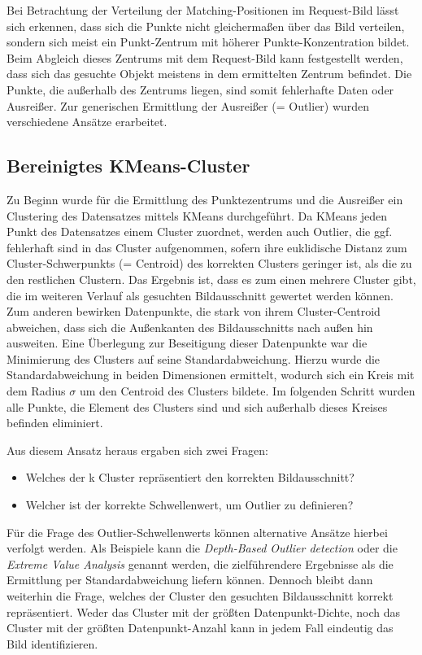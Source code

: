 \documentclass[
    type=Projektarbeit,
    status=draft, %
    language=german, %
    bibengine=bibtex,
]{unibwm-inf-thesis}
\begin{document}
    Bei Betrachtung der Verteilung der Matching-Positionen im Request-Bild lässt sich erkennen, dass sich die Punkte nicht gleichermaßen über das Bild verteilen, sondern sich meist ein Punkt-Zentrum mit höherer Punkte-Konzentration bildet.
    Beim Abgleich dieses Zentrums mit dem Request-Bild kann festgestellt werden, dass sich das gesuchte Objekt meistens in dem ermittelten Zentrum befindet.
    Die Punkte, die außerhalb des Zentrums liegen, sind somit fehlerhafte Daten oder Ausreißer.
    Zur generischen Ermittlung der Ausreißer (= Outlier) wurden verschiedene Ansätze erarbeitet.

    \subsection{Bereinigtes KMeans-Cluster}
    Zu Beginn wurde für die Ermittlung des Punktezentrums und die Ausreißer ein Clustering des Datensatzes mittels KMeans durchgeführt.
    Da KMeans jeden Punkt des Datensatzes einem Cluster zuordnet, werden auch Outlier, die ggf. fehlerhaft sind in das Cluster aufgenommen,
    sofern ihre euklidische Distanz zum Cluster-Schwerpunkts (= Centroid) des korrekten Clusters geringer ist, als die zu den restlichen Clustern.
    Das Ergebnis ist, dass es zum einen mehrere Cluster gibt, die im weiteren Verlauf als gesuchten Bildausschnitt gewertet werden können.
    Zum anderen bewirken Datenpunkte, die stark von ihrem Cluster-Centroid abweichen, dass sich die Außenkanten des Bildausschnitts nach außen hin ausweiten.
    Eine Überlegung zur Beseitigung dieser Datenpunkte war die Minimierung des Clusters auf seine Standardabweichung.
    Hierzu wurde die Standardabweichung in beiden Dimensionen ermittelt, wodurch sich ein Kreis mit dem Radius $\sigma$ um den Centroid des Clusters bildete.
    Im folgenden Schritt wurden alle Punkte, die Element des Clusters sind und sich außerhalb dieses Kreises befinden eliminiert.

    Aus diesem Ansatz heraus ergaben sich zwei Fragen:
    \begin{itemize}
        \item Welches der k Cluster repräsentiert den korrekten Bildausschnitt?
        \item Welcher ist der korrekte Schwellenwert, um Outlier zu definieren?
    \end{itemize}

    Für die Frage des Outlier-Schwellenwerts können alternative Ansätze hierbei verfolgt werden.
    Als Beispiele kann die \textit{Depth-Based Outlier detection} oder die \textit{Extreme Value Analysis} genannt werden, die zielführendere Ergebnisse als die Ermittlung per Standardabweichung liefern können.
    Dennoch bleibt dann weiterhin die Frage, welches der Cluster den gesuchten Bildausschnitt korrekt repräsentiert.
    Weder das Cluster mit der größten Datenpunkt-Dichte, noch das Cluster mit der größten Datenpunkt-Anzahl kann in jedem Fall eindeutig das Bild identifizieren.
\end{document}
